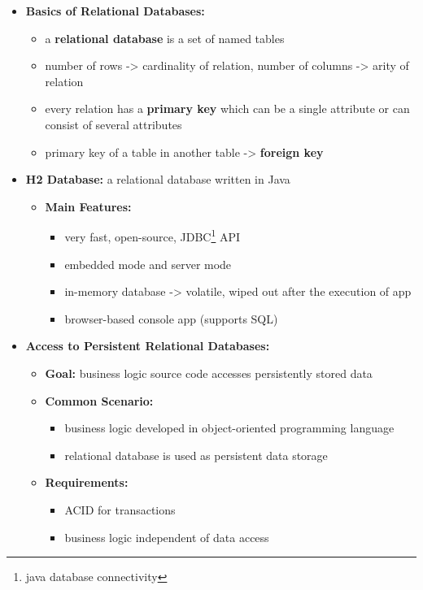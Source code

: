 \documentclass[ieeetran]{article}
\begin{document}
\begin{itemize}
  \item \textbf{Basics of Relational Databases:}
	  \begin{itemize}
	    \item a \textbf{relational database} is a set of named tables
	\item number of rows -> cardinality of relation, number of columns -> arity of relation
	\item every relation has a \textbf{primary key} which can be a single attribute or can consist of several attributes
\item primary key of a table in another table -> \textbf{foreign key}
	  \end{itemize}

\item \textbf{H2 Database:} a relational database written in Java
	\begin{itemize}
	  \item \textbf{Main Features:}
		  \begin{itemize}
			  \item very fast, open-source, JDBC\footnote{java database connectivity} API
		\item embedded mode and server mode
			\item in-memory database -> volatile, wiped out after the execution of app
		\item browser-based console app (supports SQL)
		  \end{itemize}
	\end{itemize}
\item \textbf{Access to Persistent Relational Databases:}
	\begin{itemize}
	  \item \textbf{Goal:} business logic source code accesses persistently stored data
	\item \textbf{Common Scenario:}
		\begin{itemize}
		  \item business logic developed in object-oriented programming language
		\item relational database is used as persistent data storage

		\end{itemize}
		\item \textbf{Requirements:}
			\begin{itemize}
			  \item ACID for transactions
			\item business logic independent of data access
			\end{itemize}


\end{itemize}
\end{itemize}
\end{document}
